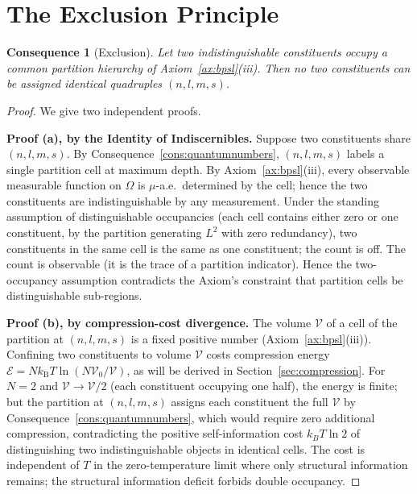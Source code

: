 \documentclass[11pt,twocolumn,a4paper]{article}
\theoremstyle{axiomstyle}
\theoremstyle{conseqstyle}
\newtheorem{consequence}{Consequence}
\theoremstyle{definition}
\theoremstyle{remark}
\newcommand{\kB}{k_{\mathrm{B}}}
\begin{document}
\section{The Exclusion Principle}
\label{sec:pauli}

\begin{consequence}[Exclusion]
\label{cons:pauli}
Let two indistinguishable constituents occupy a common partition hierarchy of Axiom~\ref{ax:bpsl}(iii). Then no two constituents can be assigned identical quadruples $(n,l,m,s)$.
\end{consequence}

\begin{proof}
We give two independent proofs.

\textbf{Proof (a), by the Identity of Indiscernibles.} Suppose two constituents share $(n,l,m,s)$. By Consequence~\ref{cons:quantumnumbers}, $(n,l,m,s)$ labels a single partition cell at maximum depth. By Axiom~\ref{ax:bpsl}(iii), every observable measurable function on $\Omega$ is $\mu$-a.e.\ determined by the cell; hence the two constituents are indistinguishable by any measurement. Under the standing assumption of distinguishable occupancies (each cell contains either zero or one constituent, by the partition generating $L^{2}$ with zero redundancy), two constituents in the same cell is the same as one constituent; the count is off. The count is observable (it is the trace of a partition indicator). Hence the two-occupancy assumption contradicts the Axiom's constraint that partition cells be distinguishable sub-regions.

\textbf{Proof (b), by compression-cost divergence.} The volume $\mathcal{V}$ of a cell of the partition at $(n,l,m,s)$ is a fixed positive number (Axiom~\ref{ax:bpsl}(iii)). Confining two constituents to volume $\mathcal{V}$ costs compression energy $\mathcal{E}=N\kB T\ln(N\mathcal{V}_{0}/\mathcal{V})$, as will be derived in Section~\ref{sec:compression}. For $N=2$ and $\mathcal{V}\to\mathcal{V}/2$ (each constituent occupying one half), the energy is finite; but the partition at $(n,l,m,s)$ assigns each constituent the full $\mathcal{V}$ by Consequence~\ref{cons:quantumnumbers}, which would require zero additional compression, contradicting the positive self-information cost $k_{B}T\ln 2$ of distinguishing two indistinguishable objects in identical cells. The cost is independent of $T$ in the zero-temperature limit where only structural information remains; the structural information deficit forbids double occupancy.
\end{proof}
\end{document}

